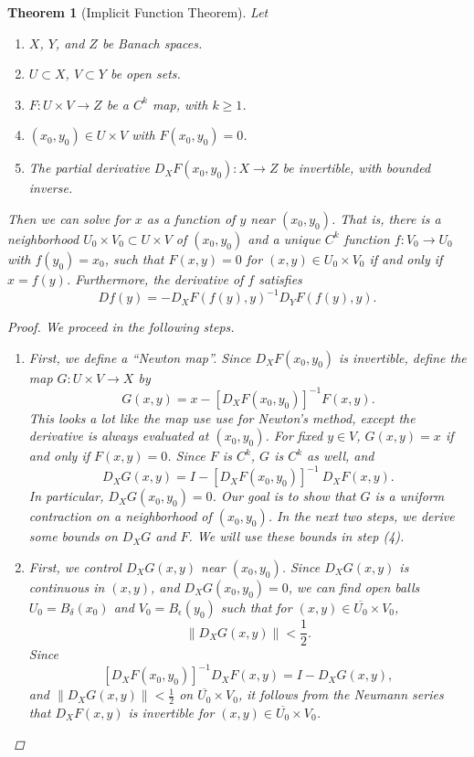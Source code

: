 \documentclass[12pt]{amsart}         %
\newtheorem{theorem}{Theorem}[section]
\theoremstyle{remark}
\begin{document}
\begin{theorem}[Implicit Function Theorem]
Let
\begin{enumerate}
\item $X$, $Y$, and $Z$ be Banach spaces.
\item $U \subset X$, $V \subset Y$ be open sets.
\item $F: U \times V \rightarrow Z$ be a $C^k$ map, with $k \geq 1$.
\item $(x_0, y_0) \in U \times V$ with $F(x_0, y_0) = 0$.
\item The partial derivative $D_X F(x_0, y_0): X \rightarrow Z$ be invertible, with bounded inverse.
\end{enumerate}
Then we can solve for $x$ as a function of $y$ near $(x_0, y_0)$. That is, there is a neighborhood $U_0 \times V_0 \subset U \times V$ of $(x_0, y_0)$ and a unique $C^k$ function $f: V_0 \rightarrow U_0$ with $f(y_0) = x_0$, such that $F(x, y) = 0$ for $(x, y) \in U_0 \times V_0$ if and only if $x = f(y)$. Furthermore, the derivative of $f$ satisfies
\[
Df(y) = -D_X F(f(y),y)^{-1} D_Y F(f(y),y).
\]

\begin{proof}We proceed in the following steps.
\begin{enumerate}
\item First, we define a ``Newton map''. Since $D_X F(x_0, y_0)$ is invertible, define the map $G: U \times V \rightarrow X$ by 
\begin{equation*}
G(x, y) = x - [D_X F(x_0, y_0)]^{-1} F(x, y).
\end{equation*}
This looks a lot like the map use use for Newton's method, except the derivative is always evaluated at $(x_0, y_0)$. For fixed $y \in V$, $G(x, y) = x$ if and only if $F(x, y) = 0$. Since $F$ is $C^k$, $G$ is $C^k$ as well, and
\[
D_XG(x, y) = I - [D_XF(x_0, y_0)]^{-1} \: D_XF(x, y).
\]
In particular, $D_XG(x_0, y_0) = 0$. Our goal is to show that $G$ is a uniform contraction on a neighborhood of $(x_0, y_0)$. In the next two steps, we derive some bounds on $D_XG$ and $F$. We will use these bounds in step (4).

\item First, we control $D_XG(x, y)$ near $(x_0, y_0)$. Since $D_XG(x, y)$ is continuous in $(x,y)$, and $D_XG(x_0, y_0) = 0$, we can find open balls $U_0 = B_\delta(x_0)$ and $V_0 = B_\epsilon(y_0)$ such that for $(x, y) \in \overline{U_0} \times V_0$,
\[
\|D_XG(x, y)\| < \frac{1}{2}.
\]
Since 
\[
[D_XF(x_0, y_0)]^{-1} D_XF(x, y) = I - D_XG(x, y),
\]
and $\|D_XG(x, y)\| < \frac{1}{2}$ on $\overline{U_0} \times V_0$, it follows from the Neumann series that $D_XF(x, y)$ is invertible for $(x, y) \in \overline{U_0} \times V_0$.


\end{enumerate}
\end{proof}
\end{theorem}
\end{document}

